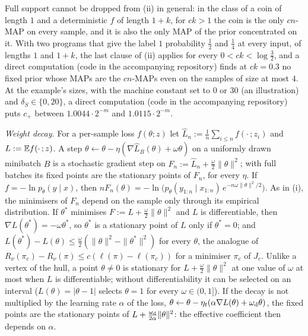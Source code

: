 Full support cannot be dropped from (ii) in general: in the class of a coin of length $1$ and a deterministic $f$ of length $1+k$, for $ck>1$ the coin is the only $cn$-MAP on every sample, and it is also the only MAP of the prior concentrated on it. With two programs that give the label $1$ probability $\frac12$ and $\frac14$ at every input, of lengths $1$ and $1+k$, the last clause of (ii) applies for every $0<ck<\log\frac32$, and a direct computation (code in the accompanying repository) finds at $ck=0.3$ no fixed prior whose MAPs are the $cn$-MAPs even on the samples of size at most $4$. At the example's sizes, with the machine constant set to $0$ or $30$ (an illustration) and $\delta_S\in\{0,20\}$, a direct computation (code in the accompanying repository) puts $c_+$ between $1.0044\cdot2^{-m}$ and $1.0115\cdot2^{-m}$.

\emph{Weight decay.} For a per-sample loss $f(\theta;z)$ let $\hat L_n:=\frac1n\sum_{i\le n}f(\cdot\,;z_i)$ and $L:=\mathbb{E} f(\cdot\,;z)$. A step $\theta\leftarrow\theta-\eta(\nabla\hat L_B(\theta)+\omega\theta)$ on a uniformly drawn minibatch $B$ is a stochastic gradient step on $F_n:=\hat L_n+\frac\omega2\|\theta\|^2$; with full batches its fixed points are the stationary points of $F_n$, for every $\eta$. If $f=-\ln p_\theta(y\mid x)$, then $nF_n(\theta)=-\ln\big(p_\theta(y_{1:n}\mid x_{1:n})\,e^{-n\omega\|\theta\|^2/2}\big)$. As in (i), the minimisers of $F_n$ depend on the sample only through its empirical distribution. If $\theta^*$ minimises $F:=L+\frac\omega2\|\theta\|^2$ and $L$ is differentiable, then $\nabla L(\theta^*)=-\omega\theta^*$, so $\theta^*$ is a stationary point of $L$ only if $\theta^*=0$; and $L(\theta^*)-L(\theta)\le\frac\omega2(\|\theta\|^2-\|\theta^*\|^2)$ for every $\theta$, the analogue of $R_\nu(\pi_c)-R_\nu(\pi)\le c(\ell(\pi)-\ell(\pi_c))$ for a minimiser $\pi_c$ of $J_c$. Unlike a vertex of the hull, a point $\theta\ne0$ is stationary for $L+\frac\omega2\|\theta\|^2$ at one value of $\omega$ at most when $L$ is differentiable; without differentiability it can be selected on an interval ($L(\theta)=|\theta-1|$ selects $\theta=1$ for every $\omega\in(0,1]$). If the decay is not multiplied by the learning rate $\alpha$ of the loss, $\theta\leftarrow\theta-\eta_t(\alpha\nabla L(\theta)+\omega_{\rm d}\theta)$, the fixed points are the stationary points of $L+\frac{\omega_{\rm d}}{2\alpha}\|\theta\|^2$: the effective coefficient then depends on $\alpha$.

